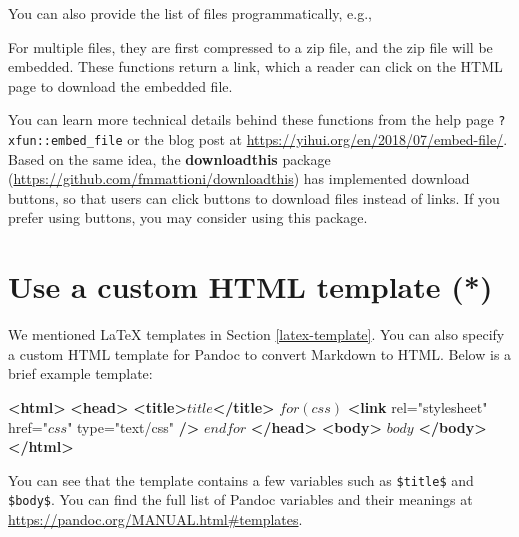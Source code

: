 \documentclass[
  11pt,
]{krantz}
\newenvironment{Shaded}{\begin{snugshade}}{\end{snugshade}}
\newcommand{\CommentTok}[1]{\textcolor[rgb]{0.37,0.37,0.37}{\textit{#1}}}
\newcommand{\KeywordTok}[1]{\textcolor[rgb]{0.27,0.27,0.27}{\textbf{#1}}}
\newcommand{\NormalTok}[1]{#1}
\newcommand{\OperatorTok}[1]{\textcolor[rgb]{0.43,0.43,0.43}{\textbf{#1}}}
\newcommand{\OtherTok}[1]{\textcolor[rgb]{0.37,0.37,0.37}{#1}}
\newcommand{\StringTok}[1]{\textcolor[rgb]{0.5,0.5,0.5}{#1}}
\begin{document}
You can also provide the list of files programmatically, e.g.,

\begin{Shaded}
\end{Shaded}

For multiple files, they are first compressed to a zip file, and the zip file will be embedded. These functions return a link, which a reader can click on the HTML page to download the embedded file.

You can learn more technical details behind these functions from the help page \texttt{?xfun::embed\_file} or the blog post at \url{https://yihui.org/en/2018/07/embed-file/}. Based on the same idea, the \textbf{downloadthis} package (\url{https://github.com/fmmattioni/downloadthis}) has implemented download buttons, so that users can click buttons to download files instead of links. If you prefer using buttons, you may consider using this package.

\hypertarget{html-template}{%
\section{Use a custom HTML template (*)}\label{html-template}}

We mentioned LaTeX templates in Section \ref{latex-template}. You can also specify a custom HTML template for Pandoc to convert Markdown to HTML. Below is a brief example template:

\begin{Shaded}
\begin{Highlighting}[]
\KeywordTok{<html>}
  \KeywordTok{<head>}
    \KeywordTok{<title>}\NormalTok{$title$}\KeywordTok{</title>}
\NormalTok{    $for(css)$}
    \KeywordTok{<link}\OtherTok{ rel=}\StringTok{"stylesheet"}\OtherTok{ href=}\StringTok{"$css$"}\OtherTok{ type=}\StringTok{"text/css"} \KeywordTok{/>}
\NormalTok{    $endfor$}
  \KeywordTok{</head>}
  \KeywordTok{<body>}
\NormalTok{  $body$}
  \KeywordTok{</body>}
\KeywordTok{</html>}
\end{Highlighting}
\end{Shaded}

You can see that the template contains a few variables such as \texttt{\$title\$} and \texttt{\$body\$}. You can find the full list of Pandoc variables and their meanings at \url{https://pandoc.org/MANUAL.html\#templates}.
\end{document}
